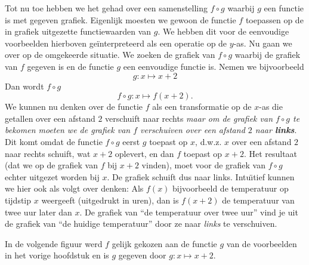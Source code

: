 Tot nu toe hebben we het gehad over een samenstelling $f\circ g$
waarbij $g$ een functie is met gegeven grafiek. Eigenlijk moesten we
gewoon de functie $f$ toepassen op de in grafiek uitgezette
functiewaarden van $g$. We hebben dit voor de eenvoudige voorbeelden
hierboven ge\"interpreteerd als een operatie op de $y$-as. Nu gaan we
over op de omgekeerde situatie. We zoeken de grafiek van
$f\circ g$ waarbij de grafiek van $f$ gegeven is en de functie $g$ een
eenvoudige functie is. Nemen we bijvoorbeeld
\[
g:x\mapsto x+2
\]
Dan wordt $f\circ g$
\[
f\circ g:x\mapsto f(x+2).
\]
We kunnen nu denken over de functie $f$ als een transformatie op de
$x$-as die getallen over een afstand $2$ verschuift naar rechts {\em
  maar om de grafiek van $f\circ g$ te bekomen moeten we de grafiek
  van $f$ verschuiven over een afstand $2$ naar {\bf links}}. Dit komt
omdat de functie $f\circ g$ eerst $g$ toepast op $x$, d.w.z. $x$ over
een afstand $2$ naar rechts schuift, wat $x+2$ oplevert, en dan $f$
toepast op $x+2$. Het resultaat (dat we op de grafiek van $f$ bij
$x+2$ vinden), moet voor de grafiek van $f\circ g$ echter uitgezet
worden bij $x$. De grafiek schuift dus naar links.  Intu\"\i tief
kunnen we hier ook als volgt over denken: Als $f(x)$ bijvoorbeeld de
temperatuur op tijdstip $x$ weergeeft (uitgedrukt in uren), dan is
$f(x+2)$ de temperatuur van twee uur later dan $x$. De grafiek van
``de temperatuur over twee uur'' vind je uit de grafiek van ``de
huidige temperatuur'' door ze naar {\em links} te verschuiven.

In de volgende figuur werd $f$ gelijk gekozen aan de functie $g$
van de voorbeelden in het vorige hoofdstuk en is $g$ gegeven door
$g:x\mapsto x+2$.

\begin{center}
\end{center}

